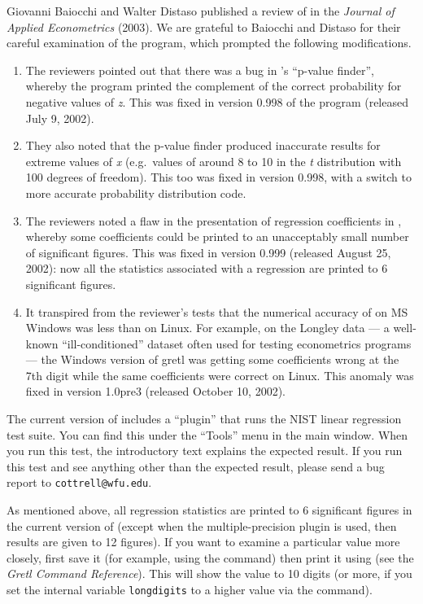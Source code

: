 Giovanni Baiocchi and Walter Distaso published a review of 
in the \emph{Journal of Applied Econometrics} (2003).  We are grateful
to Baiocchi and Distaso for their careful examination of the program,
which prompted the following modifications.

\begin{enumerate}
\item The reviewers pointed out that there was a bug in 's
  ``p-value finder'', whereby the program printed the complement of
  the correct probability for negative values of \emph{z}.  This was
  fixed in version 0.998 of the program (released July 9, 2002).
\item They also noted that the p-value finder produced inaccurate
  results for extreme values of \emph{x} (e.g.\ values of around 8 to
  10 in the \emph{t} distribution with 100 degrees of freedom).  This
  too was fixed in  version 0.998, with a switch to more
  accurate probability distribution code.
\item The reviewers noted a flaw in the presentation of regression
  coefficients in , whereby some coefficients could be
  printed to an unacceptably small number of significant figures.
  This was fixed in version 0.999 (released August 25, 2002): now all
  the statistics associated with a regression are printed to 6
  significant figures.
\item It transpired from the reviewer's tests that the numerical
  accuracy of  on MS Windows was less than on Linux.  For
  example, on the Longley data --- a well-known ``ill-conditioned''
  dataset often used for testing econometrics programs --- the Windows
  version of gretl was getting some coefficients wrong at the 7th
  digit while the same coefficients were correct on Linux.  This
  anomaly was fixed in  version 1.0pre3 (released October
  10, 2002).
\end{enumerate}

The current version of  includes a ``plugin'' that runs the
NIST linear regression test suite.  You can find this under the
``Tools'' menu in the main window.  When you run this test, the
introductory text explains the expected result.  If you run this test
and see anything other than the expected result, please send a bug
report to \verb+cottrell@wfu.edu+.  

As mentioned above, all regression statistics are printed to 6
significant figures in the current version of  (except when
the multiple-precision plugin is used, then results are given to 12
figures).  If you want to examine a particular value more closely,
first save it (for example, using the  command) then print
it using  (see the \emph{Gretl Command Reference}).
This will show the value to 10 digits (or more, if you set the
internal variable \texttt{longdigits} to a higher value via the
 command).

